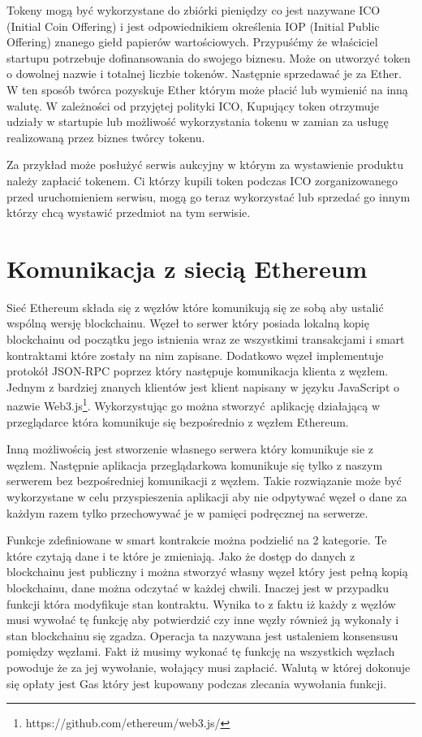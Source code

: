 \documentclass[]{llncs}
\begin{document}
  Tokeny mogą być wykorzystane do zbiórki pieniędzy co jest nazywane ICO
  (Initial Coin Offering) i jest odpowiednikiem określenia IOP (Initial Public
  Offering) znanego giełd papierów wartościowych. Przypuśćmy że właściciel
  startupu potrzebuje dofinansowania do swojego biznesu. Może on utworzyć token
  o dowolnej nazwie i totalnej liczbie tokenów. Następnie sprzedawać je za
  Ether. W ten sposób twórca pozyskuje Ether którym może płacić lub wymienić na
  inną walutę. W zależności od przyjętej polityki ICO, Kupujący token otrzymuje
  udziały w startupie lub możliwość wykorzystania tokenu w zamian za usługę
  realizowaną przez biznes twórcy tokenu.

  Za przykład może posłużyć serwis aukcyjny w którym za wystawienie produktu
  należy zapłacić tokenem. Ci którzy kupili token podczas ICO zorganizowanego
  przed uruchomieniem serwisu, mogą go teraz wykorzystać lub sprzedać go innym
  którzy chcą wystawić przedmiot na tym serwisie.

\section{Komunikacja z siecią Ethereum}

  Sieć Ethereum\cite{ethereum-doc} składa się z węzłów które komunikują się ze sobą aby ustalić
  wspólną wersję blockchainu. Węzeł to serwer który posiada lokalną kopię
  blockchainu od początku jego istnienia wraz ze wszystkimi transakcjami i smart
  kontraktami które zostały na nim zapisane. Dodatkowo węzeł implementuje
  protokół JSON-RPC poprzez który następuje komunikacja klienta z węzłem.
  Jednym z bardziej znanych klientów jest klient napisany w języku JavaScript o
  nazwie Web3.js\footnote{https://github.com/ethereum/web3.js/}. Wykorzystując
  go można stworzyć aplikację działającą w przeglądarce która komunikuje się
  bezpośrednio z węzłem Ethereum.

  Inną możliwością jest stworzenie własnego serwera który komunikuje sie z
  węzłem. Następnie aplikacja przeglądarkowa komunikuje się tylko z naszym
  serwerem bez bezpośredniej komunikacji z węzłem. Takie rozwiązanie może być
  wykorzystane w celu przyspieszenia aplikacji aby nie odpytywać węzeł o dane za
  każdym razem tylko przechowywać je w pamięci podręcznej na serwerze.

  Funkcje zdefiniowane w smart kontrakcie można podzielić na 2 kategorie. Te
  które czytają dane i te które je zmieniają. Jako że dostęp do danych z
  blockchainu jest publiczny i można stworzyć własny węzeł który jest pełną
  kopią blockchainu, dane można odczytać w każdej chwili. Inaczej jest w
  przypadku funkcji która modyfikuje stan kontraktu. Wynika to z faktu iż każdy
  z węzłów musi wywołać tę funkcję aby potwierdzić czy inne węzły również ją
  wykonały i stan blockchainu się zgadza. Operacja ta nazywana jest ustaleniem
  konsensusu pomiędzy węzłami. Fakt iż musimy wykonać tę funkcję na wszystkich
  węzłach powoduje że za jej wywołanie, wołający musi zapłacić. Walutą w
  której dokonuje się opłaty jest Gas który jest kupowany podczas zlecania
  wywołania funkcji.
\end{document}
